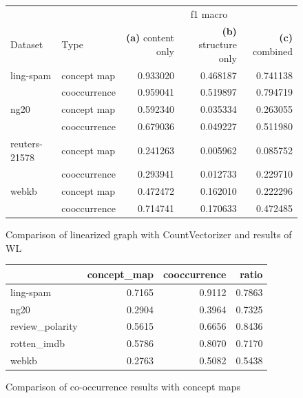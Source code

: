 \begin{figure}[ht]
\centering
\begin{tabular}{llrrr}
          & & \multicolumn{3}{c}{f1 macro} \\
Dataset & Type & \textbf{(a)} content only & \textbf{(b)} structure only & \textbf{(c)} combined\\
\midrule
ling-spam & concept map &  0.933020 &  0.468187 &  0.741138 \\
          & cooccurrence &  0.959041 &  0.519897 &  0.794719 \\
\midrule
ng20 & concept map &  0.592340 &  0.035334 &  0.263055 \\
          & cooccurrence &  0.679036 &  0.049227 &  0.511980 \\
\midrule
reuters-21578 & concept map &  0.241263 &  0.005962 &  0.085752 \\
          & cooccurrence &  0.293941 &  0.012733 &  0.229710 \\
\midrule
webkb & concept map &  0.472472 &  0.162010 &  0.222296 \\
          & cooccurrence &  0.714741 &  0.170633 &  0.472485 \\
\bottomrule
\end{tabular}
\caption{Comparison of linearized graph with CountVectorizer and results of WL}
\end{figure}


\begin{figure}[ht]
\centering
\begin{tabular}{lrrr}
&  concept\_map &  cooccurrence &   ratio \\
\midrule
ling-spam       &  0.7165 &  0.9112 &  0.7863 \\
ng20            &  0.2904 &  0.3964 &  0.7325 \\
review\_polarity &  0.5615 &  0.6656 &  0.8436 \\
rotten\_imdb     &  0.5786 &  0.8070 &  0.7170 \\
webkb           &  0.2763 &  0.5082 &  0.5438 \\
\bottomrule
\end{tabular}
\caption{Comparison of co-occurrence results with concept maps}
\end{figure}

